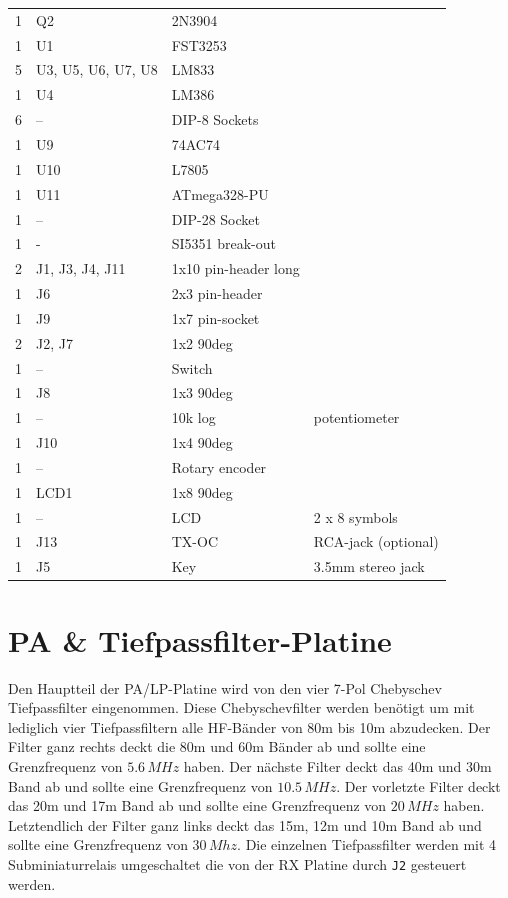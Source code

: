 \documentclass[10pt, a4paper,twoside]{scrartcl}
\begin{document}
\begin{longtable}{|l|p{6cm}|l|l|}
1 & Q2 & 2N3904 & \\
1 & U1 & FST3253 & \\
5 & U3, U5, U6, U7, U8 & LM833 & \\
1 & U4 & LM386 & \\ 
6 & -- & DIP-8 Sockets & \\
1 & U9 & 74AC74 & \\
1 & U10 & L7805 & \\
1 & U11 & ATmega328-PU & \\
1 & --  & DIP-28 Socket & \\
1 & - & SI5351 break-out & \\
2 & J1, J3, J4, J11 & 1x10 pin-header long & \\
1 & J6 & 2x3 pin-header & \\
1 & J9 & 1x7 pin-socket & \\
2 & J2, J7 & 1x2 90deg & \\
1 & -- & Switch & \\
1 & J8 & 1x3 90deg & \\
1 & -- & 10k log & potentiometer \\
1 & J10 & 1x4 90deg & \\
1 & -- & Rotary encoder & \\
1 & LCD1 & 1x8 90deg & \\
1 & -- & LCD & 2 x 8 symbols \\
1 & J13 & TX-OC & RCA-jack (optional) \\
1 & J5 & Key & 3.5mm stereo jack\\ \hline
\end{longtable}


\cleardoublepage
\section{PA \& Tiefpassfilter-Platine} \label{sec:pa}
Den Hauptteil der PA/LP-Platine wird von den vier 7-Pol Chebyschev Tiefpassfilter eingenommen. Diese Chebyschevfilter werden benötigt um mit lediglich vier Tiefpassfiltern alle HF-Bänder von 80m bis 10m abzudecken. Der Filter ganz rechts deckt die 80m und 60m Bänder ab und sollte eine Grenzfrequenz von $5.6\,MHz$ haben. Der nächste Filter deckt das 40m und 30m Band ab und sollte eine Grenzfrequenz von $10.5\,MHz$. Der vorletzte Filter deckt das 20m und 17m Band ab und sollte eine Grenzfrequenz von $20\,MHz$ haben. Letztendlich der Filter ganz links deckt das 15m, 12m und 10m Band ab und sollte eine Grenzfrequenz von $30\,Mhz$. Die einzelnen Tiefpassfilter werden mit 4 Subminiaturrelais umgeschaltet die von der RX Platine durch \texttt{J2} gesteuert werden.
\end{document}

